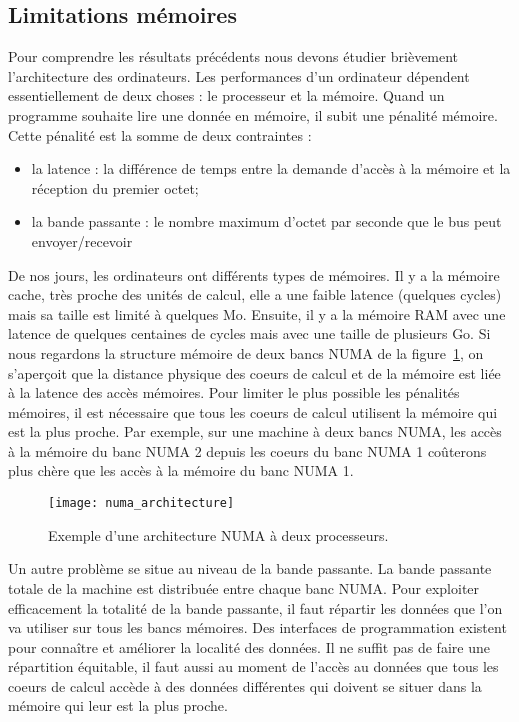 \subsection{Limitations mémoires}
Pour comprendre les résultats précédents nous devons étudier brièvement l'architecture des ordinateurs.
%
Les performances d'un ordinateur dépendent essentiellement de deux choses : le processeur et la mémoire.
%
Quand un programme souhaite lire une donnée en mémoire, il subit une pénalité mémoire.
%
Cette pénalité est la somme de deux contraintes :
\begin{itemize}
        \item la latence : la différence de temps entre la demande d'accès à la mémoire et la réception du premier octet;
        \item la bande passante : le nombre maximum d'octet par seconde que le bus peut envoyer/recevoir
\end{itemize}
%
De nos jours, les ordinateurs ont différents types de mémoires.
%
Il y a la mémoire cache, très proche des unités de calcul, elle a une faible latence (quelques cycles) mais sa taille est limité à quelques Mo.
%
Ensuite, il y a la mémoire RAM avec une latence de quelques centaines de cycles mais avec une taille de plusieurs Go.
%
Si nous regardons la structure mémoire de deux bancs NUMA de la figure~\ref{fig:numa_architecture}, on s'aperçoit que la distance physique des coeurs de calcul et de la mémoire est liée à la latence des accès mémoires.
%
Pour limiter le plus possible les pénalités mémoires, il est nécessaire que tous les coeurs de calcul utilisent la mémoire qui est la plus proche.
%
Par exemple, sur une machine à deux bancs NUMA, les accès à la mémoire du banc NUMA 2 depuis les coeurs du banc NUMA 1 coûterons plus chère que les accès à la mémoire du banc NUMA 1.

\begin{figure}
  \centering
  \texttt{[image: numa\_architecture]}
  \caption{Exemple d'une architecture NUMA à deux processeurs.}
  \label{fig:numa_architecture}
\end{figure}

Un autre problème se situe au niveau de la bande passante.
%
La bande passante totale de la machine est distribuée entre chaque banc NUMA.
%
Pour exploiter efficacement la totalité de la bande passante, il faut répartir les données que l'on va utiliser sur tous les bancs mémoires.
%
Des interfaces de programmation existent pour connaître et améliorer la localité des données.
%
Il ne suffit pas de faire une répartition équitable, il faut aussi au moment de l'accès au données que tous les coeurs de calcul accède à des données différentes qui doivent se situer dans la mémoire qui leur est la plus proche.
